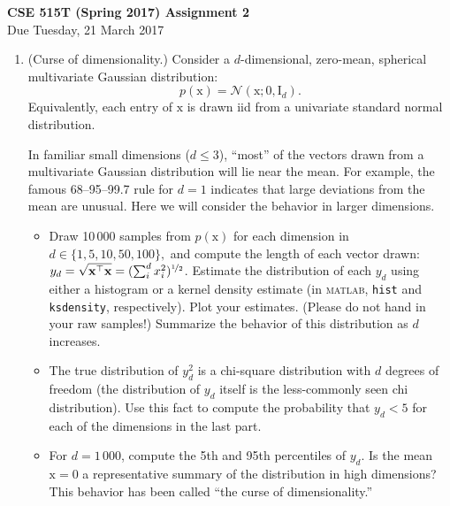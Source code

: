 \documentclass{article}
\newcommand{\acro}[1]{\textsc{\MakeLowercase{#1}}}
\newcommand{\mc}[1]{\mathcal{#1}}
\newcommand{\mat}[1]{\bm{\mathrm{#1}}}
\renewcommand{\vec}[1]{\bm{\mathrm{#1}}}
\newcommand{\trans}{^\top}
\begin{document}
{\large \textbf{CSE 515T (Spring 2017) Assignment 2}} \\
Due Tuesday, 21 March 2017 \\

\begin{enumerate}

\item
  (Curse of dimensionality.)
  Consider a $d$-dimensional, zero-mean, spherical multivariate
  Gaussian distribution:
  \begin{equation*}
    p(\vec{x}) = \mc{N}(\vec{x}; \vec{0}, \mat{I}_d).
  \end{equation*}
  Equivalently, each entry of $\vec{x}$ is drawn iid from a univariate
  standard normal distribution.

  In familiar small dimensions ($d \leq 3$), ``most'' of the vectors
  drawn from a multivariate Gaussian distribution will lie near the
  mean.  For example, the famous 68--95--99.7 rule for $d = 1$
  indicates that large deviations from the mean are unusual.  Here we
  will consider the behavior in larger dimensions.
  \begin{itemize}
  \item Draw 10\,000 samples from $p(\vec{x})$ for each dimension in
    $d \in \{1, 5, 10, 50, 100\},$ and compute the length of each
    vector drawn: $y_d = \sqrt{\vec{x}\trans \vec{x}} = (\sum_i^d
    x_i^2)^{\nicefrac{1}{2}}$.  Estimate the distribution of each
    $y_d$ using either a histogram or a kernel density estimate (in
    \acro{MATLAB}, \texttt{hist} and \texttt{ksdensity},
    respectively).  Plot your estimates.  (Please do not hand in your
    raw samples!)  Summarize the behavior of this distribution as $d$
    increases.
  \item
    The true distribution of $y_d^2$ is a chi-square distribution with
    $d$ degrees of freedom (the distribution of $y_d$ itself is the
    less-commonly seen chi distribution).  Use this fact to compute
    the probability that $y_d < 5$ for each of the dimensions in the
    last part.
  \item
    For $d = 1\,000$, compute the 5th and 95th percentiles of $y_d$.
    Is the mean $\vec{x} = \vec{0}$ a representative summary of the
    distribution in high dimensions?  This behavior has been called
    ``the curse of dimensionality.''
  \end{itemize}


\end{enumerate}
\end{document}
